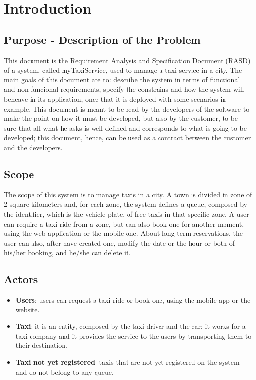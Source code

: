 \section{Introduction}
	\subsection{Purpose - Description of the Problem}
	This document is the Requirement Analysis and Specification Document (RASD) of a system, called myTaxiService, used to manage a taxi service in a city. The main goals of this document are to: describe the system in terms of functional and non-funcional requirements, specify the constrains and how the system will beheave in its application, once that it is deployed with some scenarios in example. This document is meant to be read by the developers of the software to make the point on how it must be developed, but also by the customer, to be sure that all what he asks is well defined and corresponds to what is going to be developed; this document, hence, can be used as a contract between the customer and the developers.
		
	\subsection{Scope}
	The scope of this system is to manage taxis in a city. A town is divided in zone of 2 square kilometers and, for each zone, the system defines a queue, composed by the identifier, which is the vehicle plate, of free taxis in that specific zone. A user can require a taxi ride from a zone, but can also book one for another moment, using the web application or the mobile one. About long-term reservations, the user can also, after have created one, modify the date or the hour or both of his/her booking, and he/she can delete it. 
	
	\subsection{Actors}
	\begin{itemize}
		\item \textbf{Users}: users can request a taxi ride or book one, using the mobile app or the website.
		\item \textbf{Taxi}: it is an entity, composed by the taxi driver and the car; it works for a taxi company and it provides the service to the users by transporting them to their destination.
		\item \textbf{Taxi not yet registered}: taxis that are not yet registered on the system and do not belong to any queue.
	\end{itemize}
	
